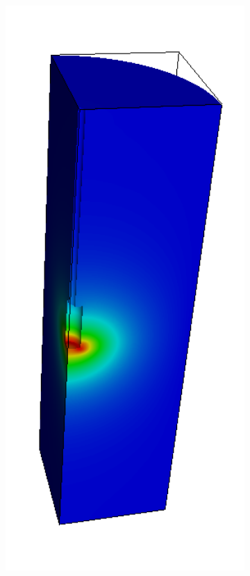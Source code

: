 \begin{figure}[!ht]
\begin{subfigure}[c]{0.49\textwidth}
\includegraphics[width=1\textwidth]{figures/ME3_pres.png}

\end{subfigure}
\end{figure}
